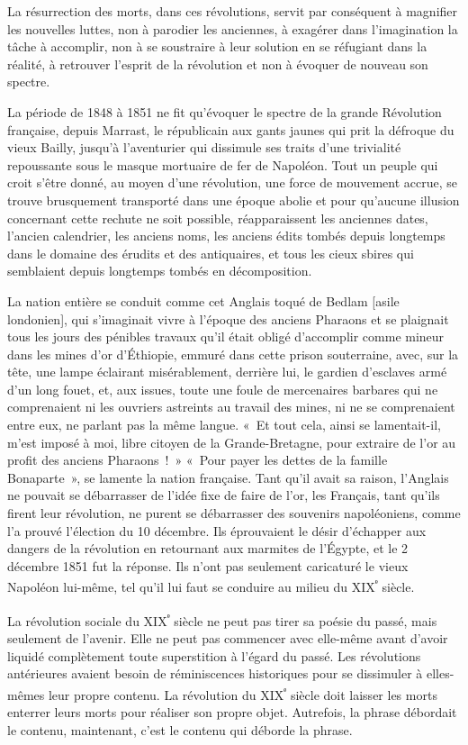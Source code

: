 \documentclass[french,twoside]{book} %
\begin{document}
La résurrection des morts, dans ces révolutions, servit par conséquent à magnifier les nouvelles luttes, non à parodier les anciennes, à exagérer dans l’imagination la tâche à accomplir, non à se soustraire à leur solution en se réfugiant dans la réalité, à retrouver l’esprit de la révolution et non à évoquer de nouveau son spectre.\par
La période de 1848 à 1851 ne fit qu’évoquer le spectre de la grande Révolution française, depuis Marrast, le républicain aux gants jaunes qui prit la défroque du vieux Bailly, jusqu’à l’aventurier qui dissimule ses traits d’une trivialité repoussante sous le masque mortuaire de fer de Napoléon. Tout un peuple qui croit s’être donné, au moyen d’une révolution, une force de mouvement accrue, se trouve brusquement transporté dans une époque abolie et pour qu’aucune illusion concernant cette rechute ne soit possible, réapparaissent les anciennes dates, l’ancien calendrier, les anciens noms, les anciens édits tombés depuis longtemps dans le domaine des érudits et des antiquaires, et tous les cieux sbires qui semblaient depuis longtemps tombés en décomposition.\par
La nation entière se conduit comme cet Anglais toqué de Bedlam [asile londonien], qui s’imaginait vivre à l’époque des anciens Pharaons et se plaignait tous les jours des pénibles travaux qu’il était obligé d’accomplir comme mineur dans les mines d’or d’Éthiopie, emmuré dans cette prison souterraine, avec, sur la tête, une lampe éclairant misérablement, derrière lui, le gardien d’esclaves armé d’un long fouet, et, aux issues, toute une foule de mercenaires barbares qui ne comprenaient ni les ouvriers astreints au travail des mines, ni ne se comprenaient entre eux, ne parlant pas la même langue. « Et tout cela, ainsi se lamentait-il, m’est imposé à moi, libre citoyen de la Grande-Bretagne, pour extraire de l’or au profit des anciens Pharaons ! » « Pour payer les dettes de la famille Bonaparte », se lamente la nation française. Tant qu’il avait sa raison, l’Anglais ne pouvait se débarrasser de l’idée fixe de faire de l’or, les Français, tant qu’ils firent leur révolution, ne purent se débarrasser des souvenirs napoléoniens, comme l’a prouvé l’élection du 10 décembre. Ils éprouvaient le désir d’échapper aux dangers de la révolution en retournant aux marmites de l’Égypte, et le 2 décembre 1851 fut la réponse. Ils n’ont pas seulement caricaturé le vieux Napoléon lui-même, tel qu’il lui faut se conduire au milieu du XIX\textsuperscript{ᵉ} siècle.\par
La révolution sociale du XIX\textsuperscript{ᵉ} siècle ne peut pas tirer sa poésie du passé, mais seulement de l’avenir. Elle ne peut pas commencer avec elle-même avant d’avoir liquidé complètement toute superstition à l’égard du passé. Les révolutions antérieures avaient besoin de réminiscences historiques pour se dissimuler à elles-mêmes leur propre contenu. La révolution du XIX\textsuperscript{ᵉ} siècle doit laisser les morts enterrer leurs morts pour réaliser son propre objet. Autrefois, la phrase débordait le contenu, maintenant, c’est le contenu qui déborde la phrase.\par
\end{document}
